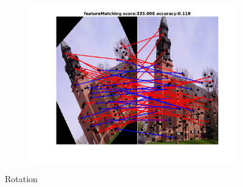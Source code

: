 \documentclass[
	fontsize=12pt,
	paper=a4,
	twoside=false,
	numbers=noenddot,
	plainheadsepline,
	toc=listof,
	toc=bibliography
]{scrartcl}
\begin{document}
\begin{figure}[h]
\begin{subfigure}[b]{0.33\textwidth}
	\end{subfigure} 
	\begin{subfigure}[b]{0.33\textwidth}
		\centering
		\includegraphics[scale=0.25]{"fig_ver2608/RealImages/ImgTrafo/anchor_descr/using_cpd_afftrafo/fi_1_featureMatching"} 
	\end{subfigure} 	
	\caption{Rotation}
	

\end{figure}
\end{document}
